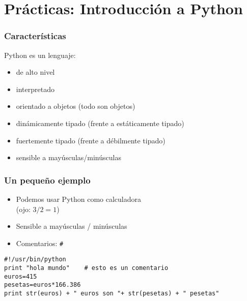 %
%

\section{Prácticas: Introducción a Python}


\begin{frame}
\frametitle{Características}

Python es un lenguaje:
\begin{itemize}
\item de alto nivel
\item interpretado
\item orientado a objetos (todo son objetos)
\item dinámicamente tipado (frente a estáticamente tipado)
\item fuertemente tipado (frente a débilmente tipado)
\item sensible a mayúsculas/minúsculas
\end{itemize}

\end{frame}


\begin{frame}[fragile]

\frametitle{Un pequeño ejemplo}

\begin{itemize}
\item Podemos usar Python como calculadora\\
(ojo: $3/2=1$)

\item Sensible a mayúsculas / minúsculas
\item Comentarios: \verb=#=

\end{itemize}

\begin{footnotesize}
\begin{verbatim}
#!/usr/bin/python
print "hola mundo"    # esto es un comentario
euros=415
pesetas=euros*166.386
print str(euros) + " euros son "+ str(pesetas) + " pesetas"
\end{verbatim}
\end{footnotesize}

\end{frame}



